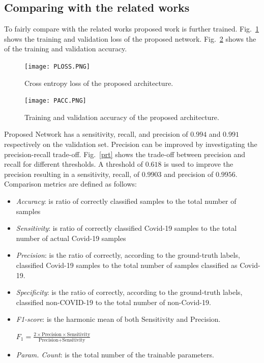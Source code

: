 \subsection{Comparing with the related works}
To fairly compare with the related works proposed work is further trained. Fig.~\ref{ploss} shows the training and validation loss of the proposed network. Fig.~\ref{pacc} shows the of the training and validation accuracy. 
\begin{center}
\begin{figure}[htbp]
\centerline{\texttt{[image: PLOSS.PNG]}}
\caption{Cross entropy loss of the proposed architecture.}
\label{ploss}
\end{figure}
\end{center}
\begin{center}
\begin{figure}[htbp]
\centerline{\texttt{[image: PACC.PNG]}}
\caption{Training and validation accuracy of the proposed architecture.}
\label{pacc}
\end{figure}
\end{center}
Proposed Network has a sensitivity, recall, and precision of $0.994$ and $0.991$ respectively on the validation set. Precision can be improved by investigating the precision-recall trade-off. Fig.~\ref{prt} shows the trade-off between precision and recall for different thresholds. A threshold of $0.618$ is used to improve the precision resulting in a sensitivity, recall, of $0.9903$ and precision of $0.9956$.
Comparison metrics are defined as follows:
\begin{itemize}
\item \textit{Accuracy}: is ratio of correctly classified samples to the total number of samples
\item \textit{Sensitivity}: is ratio of correctly classified Covid-19 samples to the total number of actual Covid-19 samples 
\item \textit{Precision}: is the ratio of correctly, according to the ground-truth labels, classified Covid-19 samples to the total number of samples classified as Covid-19.
\item \textit{Specificity}: is the ratio of correctly, according to the ground-truth labels, classified non-COVID-19 to the total number of non-Covid-19.
\item \textit{F1-score}: is the harmonic mean of both Sensitivity and Precision.
\begin{center}  
 $F_{1}=\frac{2\times\text{Precision} \times \text{Sensitivity}}{\text{Precision} + \text{Sensitivity}}$
\end{center}
\item \textit{Param. Count}: is the total number of the trainable parameters.
\end{itemize}


